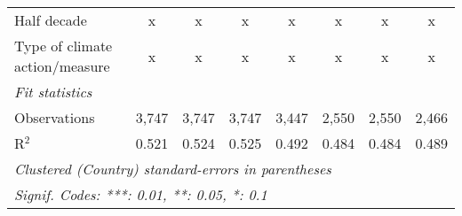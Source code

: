\begin{tabular}{lccccccc}
   Half decade                                                                             & x              & x             & x             & x             & x            & x            & x\\  
   Type of climate action/measure                                                          & x              & x             & x             & x             & x            & x            & x\\  
   \midrule \emph{Fit statistics}\\
   Observations                                                                            & 3,747          & 3,747         & 3,747         & 3,447         & 2,550        & 2,550        & 2,466\\  
   R$^2$                                                                                   & 0.521          & 0.524         & 0.525         & 0.492         & 0.484        & 0.484        & 0.489\\  
   \midrule
   \multicolumn{8}{l}{\emph{Clustered (Country) standard-errors in parentheses}}\\
   \multicolumn{8}{l}{\emph{Signif. Codes: ***: 0.01, **: 0.05, *: 0.1}}\\
\end{tabular}
\par\endgroup


